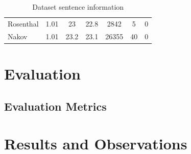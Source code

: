 \documentclass[12pt, a4paper]{report}
\theoremstyle{definition}
\theoremstyle{definition}%
\theoremstyle{definition}%
\theoremstyle{definition}%
\theoremstyle{definition}%
\theoremstyle{definition}%
\renewcommand{\cite}[1]{[\citealp{#1}]}
\begin{document}
\begin{table}
\begin{tabular}{|l|c|cc|ccc|}
		Rosenthal                         & 1.01                                                     & 23                                                           & 22.8                                                         & 2842       & 5          & 0           \\
		Nakov                             & 1.01                                                     & 23.2                                                         & 23.1                                                         & 26355      & 40         & 0           \\ \hline
	\end{tabular}
	\caption{Dataset sentence information}
	\label{tab:dataset_sentence_info}
\end{table}


\chapter{Evaluation}

\section{Evaluation Metrics}

\chapter{Results and Observations}
\end{document}
